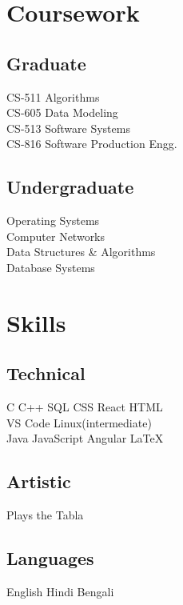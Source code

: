 \documentclass[]{deedy-resume-openfont}
\begin{document}
\begin{minipage}[t]{0.33\textwidth}

\section{Coursework}
\subsection{Graduate}
CS-511  Algorithms \\
CS-605  Data Modeling \\
CS-513  Software Systems \\
CS-816 Software Production Engg. \\
\sectionsep

\subsection{Undergraduate}
Operating Systems \\
Computer Networks \\
Data Structures \& Algorithms \\
Database Systems \\



\section{Skills}
\subsection{Technical}
C \textbullet{} C++ \textbullet{} SQL \textbullet{} CSS \textbullet{} React \textbullet{} HTML \\
VS Code \textbullet{} Linux(intermediate) \\ 
Java \textbullet{} JavaScript \textbullet{} Angular\textbullet{}  \LaTeX\
\sectionsep

\subsection{Artistic}
Plays the Tabla \\
\sectionsep

\subsection{Languages}
English \textbullet{} Hindi \textbullet{} Bengali \\
\sectionsep

%
%

\end{minipage} 
\end{document}
